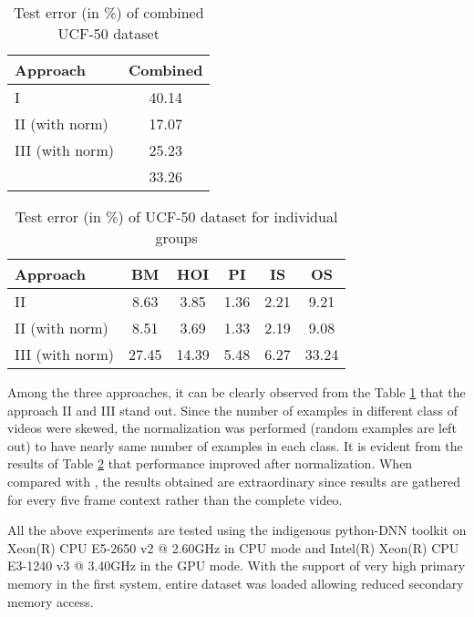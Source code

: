 \begin{table}[htbp]
   \caption{Test error (in \%) of combined UCF-50 dataset}
   \begin{center}
   \begin{tabular}{|l|c|} \hline
        \textbf{Approach}&  \textbf{Combined} \\ \hline
        I & 40.14\\ \hline
		II (with norm) &  17.07 \\ \hline		 
		III (with norm) &  25.23 \\ \hline
		\cite{recognizing50} &  33.26 \\ \hline
   \end{tabular}
   \label{tab:comrecognition}
   \medskip \small 
   \end{center}
 \end{table} 
 
\begin{table}[htbp]
   \caption{Test error (in \%) of UCF-50 dataset for individual groups}
   \begin{center}
   \begin{tabular}{|l|c|c|c|c|c|} \hline
        \textbf{Approach} & \textbf{BM} & \textbf{HOI} & \textbf{PI} & \textbf{IS} & \textbf{OS} \\ \hline
		II & 8.63 & 3.85 & 1.36 & 2.21 & 9.21 \\ \hline
		II (with norm) & 8.51 & 3.69 & 1.33 & 2.19 & 9.08 \\ \hline		 
		III (with norm) & 27.45 & 14.39 & 5.48 & 6.27 & 33.24 \\ \hline
   \end{tabular}
   \label{tab:indirecognition}
   \medskip \small 
   \end{center}
 \end{table} 
  
Among the three approaches, it can be clearly observed from the Table \ref{tab:comrecognition} that the approach II and III  stand out.  Since the number of examples in different class of videos were skewed, the normalization was performed (random examples are left out) to have nearly same number of examples in each class.  It is evident from the results of Table \ref{tab:indirecognition} that performance improved after normalization. When compared with \citep{recognizing50}, the results obtained are extraordinary since results are gathered for every five frame context rather than the complete video.
\par All the above experiments are tested using the indigenous python-DNN toolkit on  Xeon(R) CPU E5-2650 v2 @ 2.60GHz in CPU mode and Intel(R) Xeon(R) CPU E3-1240 v3 @ 3.40GHz in the GPU mode. With the support of very high primary memory in  the first system, entire dataset was loaded allowing reduced secondary memory access.


